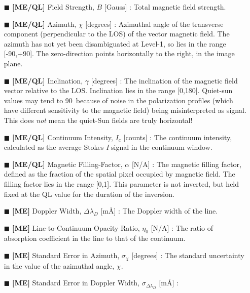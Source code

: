 \documentclass[11pt]{article}
\begin{document}
\begin{itemize}
  \renewcommand\labelitemi{\scriptsize$\blacksquare$}
  \item [\scriptsize$\blacksquare$] \textbf{[ME/QL]} Field Strength, $B$ [Gauss] : Total magnetic field
        strength.
  \item [\scriptsize$\blacksquare$] \textbf{[ME/QL]} Azimuth, $\chi$ [degrees] : Azimuthal angle of the
        transverse component (perpendicular to the LOS) of the vector magnetic field.  The azimuth has not
        yet been disambiguated at Level-1, so lies in the range [-90,+90]\degree.  The zero-direction
        points horizontally to the right, in the image plane.
  \item [\scriptsize$\blacksquare$] \textbf{[ME/QL]} Inclination, $\gamma$ [degrees] : The inclination of the
        magnetic field vector relative to the LOS.  Inclination lies in the range [0,180]\degree.  Quiet-sun
        values may tend to 90\degree\ because of noise in the polarization profiles (which have different
        sensitivity to the magnetic field) being misinterpreted as signal.  This does \textit{not} mean the
        quiet-Sun fields are truly horizontal!
  \item [\scriptsize$\blacksquare$] \textbf{[ME/QL]} Continuum Intensity, $I_{c}$ [counts] : The continuum
        intensity, calculated as the average Stokes \textit{I} signal in the continuum window.
  \item [\scriptsize$\blacksquare$] \textbf{[ME/QL]} Magnetic Filling-Factor, $\alpha$ [N/A] : The magnetic
        filling factor, defined as the fraction of the spatial pixel occupied by magnetic field.  The filling
        factor lies in the range [0,1].  This parameter is not inverted, but held fixed at the QL value for the
        duration of the inversion.
  \item [\scriptsize$\blacksquare$] \textbf{[ME]} Doppler Width, $\Delta\lambda_{D}$ [m\AA] : The Doppler width
        of the line.
  \item [\scriptsize$\blacksquare$] \textbf{[ME]} Line-to-Continuum Opacity Ratio, $\eta_{0}$ [N/A] : The
        ratio of absorption coefficient in the line to that of the continuum.
  \item [\scriptsize$\blacksquare$] \textbf{[ME]} Standard Error in Azimuth, $\sigma_{\chi}$ [degrees] : The
        standard uncertainty in the value of the azimuthal angle, $\chi$.
  \item [\scriptsize$\blacksquare$] \textbf{[ME]} Standard Error in Doppler Width, $\sigma_{\Delta\lambda_{D}}$ [m\AA] :

\end{itemize}
\end{document}

